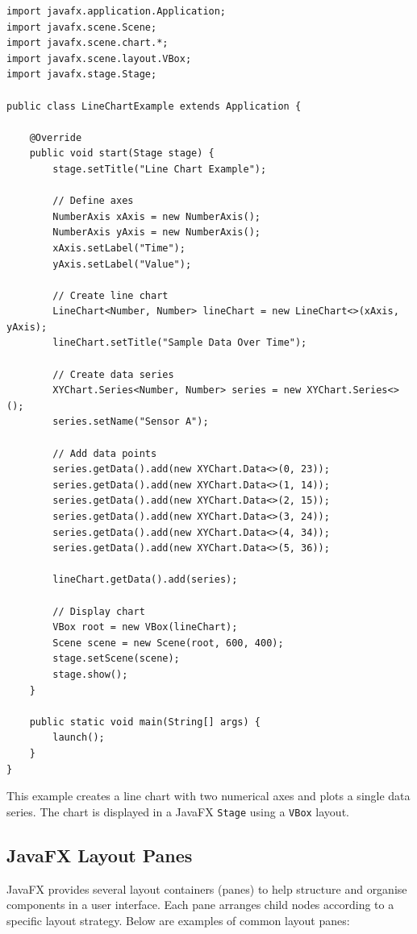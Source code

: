 \documentclass{article}
\newcommand{\codecmd}[1]{\textcolor[rgb]{0,0.5,0}{\texttt{#1}}}
\begin{document}
\begin{verbatim}
import javafx.application.Application;
import javafx.scene.Scene;
import javafx.scene.chart.*;
import javafx.scene.layout.VBox;
import javafx.stage.Stage;

public class LineChartExample extends Application {

    @Override
    public void start(Stage stage) {
        stage.setTitle("Line Chart Example");

        // Define axes
        NumberAxis xAxis = new NumberAxis();
        NumberAxis yAxis = new NumberAxis();
        xAxis.setLabel("Time");
        yAxis.setLabel("Value");

        // Create line chart
        LineChart<Number, Number> lineChart = new LineChart<>(xAxis, yAxis);
        lineChart.setTitle("Sample Data Over Time");

        // Create data series
        XYChart.Series<Number, Number> series = new XYChart.Series<>();
        series.setName("Sensor A");

        // Add data points
        series.getData().add(new XYChart.Data<>(0, 23));
        series.getData().add(new XYChart.Data<>(1, 14));
        series.getData().add(new XYChart.Data<>(2, 15));
        series.getData().add(new XYChart.Data<>(3, 24));
        series.getData().add(new XYChart.Data<>(4, 34));
        series.getData().add(new XYChart.Data<>(5, 36));

        lineChart.getData().add(series);

        // Display chart
        VBox root = new VBox(lineChart);
        Scene scene = new Scene(root, 600, 400);
        stage.setScene(scene);
        stage.show();
    }

    public static void main(String[] args) {
        launch();
    }
}
\end{verbatim}

This example creates a line chart with two numerical axes and plots a single data series. The chart is displayed in a JavaFX \codecmd{Stage} using a \codecmd{VBox} layout.

\subsection{JavaFX Layout Panes}

JavaFX provides several layout containers (panes) to help structure and organise components in a user interface. Each pane arranges child nodes according to a specific layout strategy. Below are examples of common layout panes:
\end{document}
